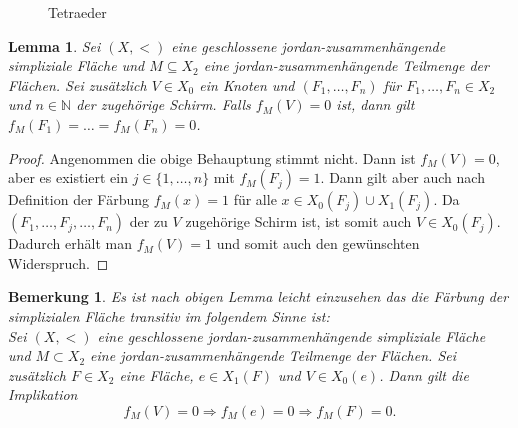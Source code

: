 \documentclass[12pt,titlepage]{article}
\newtheorem{lemma}{Lemma}
\newtheorem{bemerkung}{Bemerkung}[section]
\begin{document}
\begin{figure}[H]

 \caption{Tetraeder }
 \label{Tetraeder}
 \end{figure}
\begin{lemma}
Sei $(X,<)$ eine geschlossene jordan-zusammenhängende simpliziale Fläche und $M \subseteq X_2$ eine jordan-zusammenhängende Teilmenge der Flächen. Sei zusätzlich $V\in X_0$ ein Knoten und $(F_1,\ldots,F_n)$ für $F_1,\ldots,F_n \in X_2$ und $n \in \mathbb{N}$ der zugehörige Schirm. Falls $f_M(V)=0$ ist, dann gilt $f_M(F_1)=\ldots=f_M(F_n)=0$.
\end{lemma}
\begin{proof}
Angenommen die obige Behauptung stimmt nicht. Dann ist $f_M(V)=0$, aber es existiert ein $j\in \{1,\ldots,n\}$ mit $f_M(F_j)=1$. Dann gilt aber auch nach Definition der Färbung $f_M(x)=1$ für alle $x \in X_0(F_j)\cup X_1(F_j)$. Da $(F_1,\ldots,F_j,\ldots,F_n)$ der zu $V$ zugehörige Schirm ist, ist somit auch $V\in X_0(F_j)$. Dadurch erhält man $f_M(V)=1$ und somit auch den gewünschten Widerspruch.
\end{proof}
\begin{bemerkung}
Es ist nach obigen Lemma leicht einzusehen das die Färbung der simplizialen Fläche transitiv im folgendem Sinne ist:\\
Sei $(X,<)$ eine geschlossene jordan-zusammenhängende simpliziale Fläche und $M \subset X_2$ eine jordan-zusammenhängende Teilmenge der Flächen. Sei zusätzlich $F\in X_2$ eine Fläche, $e\in X_1(F)$ und $V\in X_0(e)$. Dann gilt die Implikation 
\[
f_M(V)=0 \Rightarrow f_M(e)=0 \Rightarrow f_M(F)=0.
\]
\end{bemerkung}
\end{document}
